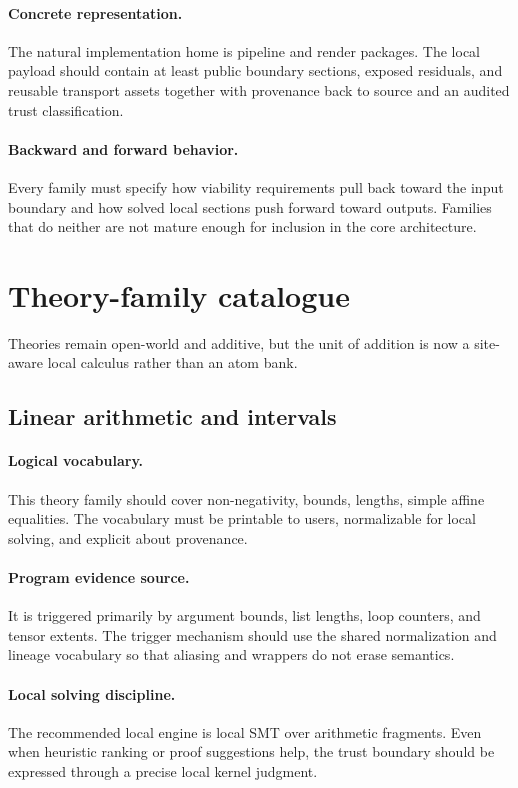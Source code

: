 \documentclass[11pt]{report}
\theoremstyle{definition}
\theoremstyle{plain}
\begin{document}
\paragraph{Concrete representation.}
The natural implementation home is pipeline and render packages. The local payload should contain
at least public boundary sections, exposed residuals, and reusable transport assets together with provenance back to source and an audited
trust classification.

\paragraph{Backward and forward behavior.}
Every family must specify how viability requirements pull back toward the
input boundary and how solved local sections push forward toward outputs.
Families that do neither are not mature enough for inclusion in the core
architecture.


\section{Theory-family catalogue}

Theories remain open-world and additive, but the unit of addition is now a site-aware local calculus rather than an atom bank.
\subsection{Linear arithmetic and intervals}

\paragraph{Logical vocabulary.}
This theory family should cover non-negativity, bounds, lengths, simple affine equalities. The vocabulary must be printable to
users, normalizable for local solving, and explicit about provenance.

\paragraph{Program evidence source.}
It is triggered primarily by argument bounds, list lengths, loop counters, and tensor extents. The trigger mechanism should use the
shared normalization and lineage vocabulary so that aliasing and wrappers do
not erase semantics.

\paragraph{Local solving discipline.}
The recommended local engine is local SMT over arithmetic fragments. Even when heuristic ranking or
proof suggestions help, the trust boundary should be expressed through a
precise local kernel judgment.
\end{document}
